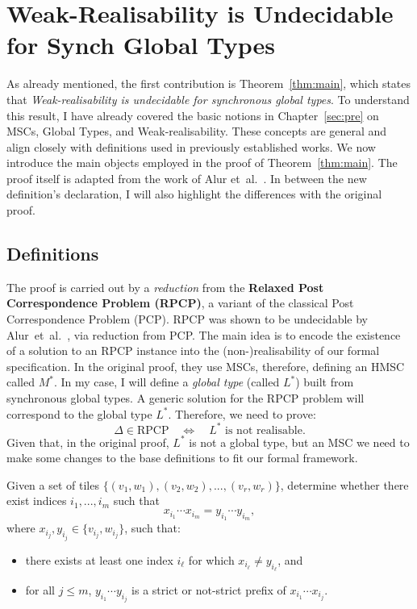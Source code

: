 \chapter{Weak-Realisability is Undecidable for Synch Global Types}\label{sec:proof}

As already mentioned, the first contribution is Theorem~\ref{thm:main},
which states that \emph{Weak-realisability is undecidable for 
synchronous global types}. 
To understand this result, I have already covered the basic notions in 
Chapter~\ref{sec:pre} on MSCs, Global Types, and Weak-realisability. 
These concepts are general and align 
closely with definitions used in previously established works. 
We now introduce the main objects employed in the proof of Theorem~\ref{thm:main}. 
The proof itself is adapted from the work of 
Alur et~al.~\cite{alur2005realizability}. 
In between the new definition's declaration, I will also highlight the 
differences with the original proof.

\section{Definitions}
The proof is carried out by a \emph{reduction} from the
\textbf{Relaxed Post Correspondence Problem (RPCP)}, a variant of
the classical Post Correspondence Problem (PCP). 
RPCP was shown to be undecidable by
Alur~et~al.~\cite{alur2005realizability}, via reduction from PCP.
The main idea is to encode the existence of a
solution to an RPCP instance into the (non-)realisability of our formal
specification. In the original proof, they use MSCs, therefore, 
defining an HMSC called $M^*$. In my case, I will define a
\emph{global type} (called $L^*$) built from synchronous global types.
A generic solution for the RPCP problem will correspond to the global
type $L^*$. Therefore, we need to prove:
$$
\Delta \in \text{RPCP} \quad\iff\quad L^* \text{ is not realisable}.
$$
Given that, in the original proof, $L^*$ is not a global type, but an MSC
we need to make some changes to the base definitions to fit our formal
framework. 

\bigskip

\begin{definition}
	Given a set of tiles $\{(v_1, w_1), (v_2, w_2), ..., (v_r, w_r)\}$, 
	determine whether there exist indices $i_1, ..., i_m$ such that
	$$x_{i_1}\cdots x_{i_m} = y_{i_1}\cdots y_{i_m},$$
	where $x_{i_j}, y_{i_j} \in \{v_{i_j}, w_{i_j}\}$, such that:
	\begin{itemize}
		\item there exists at least one index $i_\ell$ for which $x_{i_\ell}\neq y_{i_\ell}$, and
		\item for all $j \leq m$, $y_{i_1}\cdots y_{i_j}$ is a strict or 
		not-strict prefix of $x_{i_1}\cdots x_{i_j}$.
	\end{itemize}
\end{definition}

